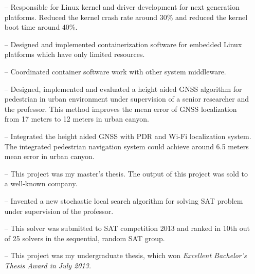 \documentclass[10pt,a4paper,roman]{moderncv}        %
\begin{document}
\begin{itemize}
  \item[--]{Responsible for Linux kernel and driver development for next
    generation platforms. Reduced the kernel crash rate around 30\% and reduced the kernel boot time around 40\%.}
  \item[--]{Designed and implemented containerization software for embedded Linux
    platforms which have only limited resources.}
  \item[--]{Coordinated container software work with other system middleware.}
\end{itemize}

\begin{itemize}
  \item[--]{Designed, implemented and evaluated a height aided GNSS algorithm for
    pedestrian in urban environment under supervision of a senior researcher
  and the professor. This method improves the mean error of GNSS localization from 17 meters to 12 meters in urban canyon.}
  \item[--]{Integrated the height aided GNSS with PDR and Wi-Fi localization system. The integrated pedestrian navigation system could achieve around 6.5 meters mean error in urban canyon.}
  \item[--]{This project was my master's thesis. The output of this project was sold to a well-known company.}
\end{itemize}

\begin{itemize}
  \item[--]{Invented a new stochastic local search algorithm for solving SAT problem under supervision of the professor.}
  \item[--]{This solver was submitted to SAT competition 2013 and ranked in 10th out of 25 solvers in the sequential, random SAT group.}
  \item[--]{This project was my undergraduate thesis, which won \em{Excellent
Bachelor's Thesis Award} in July 2013.}
\end{itemize}
\end{document}
